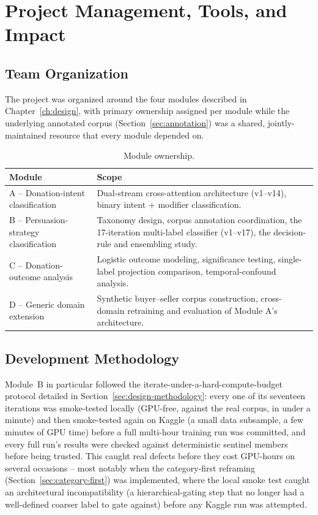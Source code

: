 \chapter{Project Management, Tools, and Impact}
\label{ch:management}

\section{Team Organization}

The project was organized around the four modules described in
Chapter~\ref{ch:design}, with primary ownership assigned per module while
the underlying annotated corpus (Section~\ref{sec:annotation}) was a shared,
jointly-maintained resource that every module depended on.

\begin{table}[H]
\centering
\caption{Module ownership.}
\label{tab:roles}
\begin{tabular}{@{}p{3.4cm}p{9.4cm}@{}}
\toprule
\textbf{Module} & \textbf{Scope} \\
\midrule
A -- Donation-intent classification & Dual-stream cross-attention architecture (v1--v14), binary intent + modifier classification. \\
B -- Persuasion-strategy classification & Taxonomy design, corpus annotation coordination, the 17-iteration multi-label classifier (v1--v17), the decision-rule and ensembling study. \\
C -- Donation-outcome analysis & Logistic outcome modeling, significance testing, single-label projection comparison, temporal-confound analysis. \\
D -- Generic domain extension & Synthetic buyer--seller corpus construction, cross-domain retraining and evaluation of Module A's architecture. \\
\bottomrule
\end{tabular}
\end{table}

\section{Development Methodology}

Module~B in particular followed the iterate-under-a-hard-compute-budget
protocol detailed in Section~\ref{sec:design-methodology}: every one of its
seventeen iterations was smoke-tested locally (GPU-free, against the real
corpus, in under a minute) and then smoke-tested again on Kaggle (a small
data subsample, a few minutes of GPU time) before a full multi-hour training
run was committed, and every full run's results were checked against
deterministic sentinel members before being trusted. This caught real
defects before they cost GPU-hours on several occasions -- most notably when
the category-first reframing (Section~\ref{sec:category-first}) was
implemented, where the local smoke test caught an architectural incompatibility
(a hierarchical-gating step that no longer had a well-defined coarser label
to gate against) before any Kaggle run was attempted.

